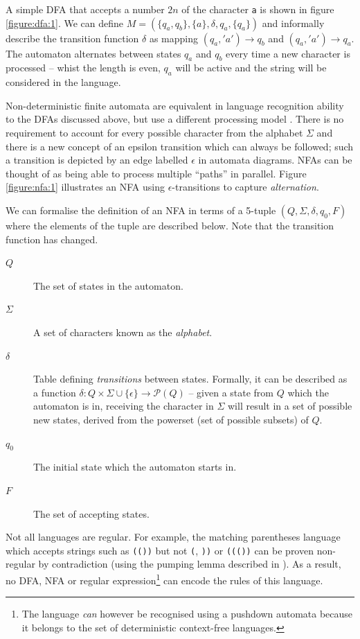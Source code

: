 \documentclass[a4paper,openany]{book}
\begin{document}
A simple DFA that accepts a number $2n$ of the character \texttt{a} is shown in figure \ref{figure:dfa:1}. We can define $M = (\{q_a,q_b\}, \{a\}, \delta, q_a, \{q_a\})$ and informally describe the transition function $\delta$ as mapping $(q_a, 'a') \rightarrow q_b$ and $(q_a, 'a') \rightarrow q_a$. The automaton alternates between states $q_a$ and $q_b$ every time a new character is processed -- whist the length is even, $q_a$ will be active and the string will be considered in the language.

Non-deterministic finite automata are equivalent in language recognition ability to the DFAs discussed above, but use a different processing model \citep[p.~46]{sipser2012introduction}. There is no requirement to account for every possible character from the alphabet $\Sigma$ and there is a new concept of an epsilon transition which can always be followed; such a transition is depicted by an edge labelled $\epsilon$ in automata diagrams. NFAs can be thought of as being able to process multiple ``paths'' in parallel. Figure \ref{figure:nfa:1} illustrates an NFA using $\epsilon$-transitions to capture \emph{alternation}.

We can formalise the definition of an NFA in terms of a 5-tuple $(Q, \Sigma, \delta, q_0, F)$ where the elements of the tuple are described below. Note that the transition function has changed.

\begin{description}
\item[$Q$] The set of states in the automaton.
\item[$\Sigma$] A set of characters known as the \emph{alphabet}.
\item[$\delta$] Table defining \emph{transitions} between states. Formally, it can be described as a function $\delta : Q \times \Sigma \cup \{\epsilon\} \rightarrow \mathcal{P}(Q)$ -- given a state from $Q$ which the automaton is in, receiving the character in $\Sigma$ will result in a set of possible new states, derived from the powerset (set of possible subsets) of $Q$.
\item[$q_0$] The initial state which the automaton starts in.
\item[$F$] The set of accepting states.
\end{description}

Not all languages are regular. For example, the matching parentheses language which accepts strings such as \texttt{(())} but not \texttt{(}, \texttt{))} or \texttt{((())} can be proven non-regular by contradiction (using the pumping lemma described in \citet{rabin1959finite}). As a result, no DFA, NFA or regular expression\footnote{The language \emph{can} however be recognised using a pushdown automata because it belongs to the set of deterministic context-free languages.} can encode the rules of this language.
\end{document}
